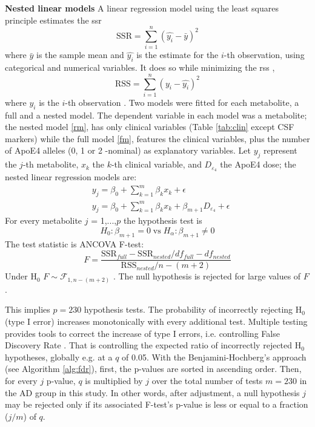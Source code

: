 \documentclass{amsart}
\begin{document}
\leavevmode\newline \textbf{Nested linear models}\hspace{.25cm}
A linear regression model using the least squares principle estimates the \acrfull{ssr}
$$\mathrm{SSR} = \sum_{i=1}^{n} (\hat{y_i}-\bar{y})^2$$ where $\bar{y}$ is the sample mean and $\hat{y_i}$ is the estimate for the $i$-th observation, using categorical and numerical variables. It does so while minimizing the \acrfull{rss} \cite{ott2015introduction}, 
$$\mathrm{RSS} = \sum_{i=1}^{n} (y_i - \hat{y_i})^2$$ where $y_i$ is the $i$-th observation \cite{ott2015introduction}. Two models were fitted for each metabolite, a full and a nested model. The dependent variable in each model was a metabolite; the nested model \eqref{rm}, has only clinical variables (Table \ref{tab:clin} except CSF markers) while the full model \eqref{fm}, features the clinical variables, plus the number of ApoE4 alleles (0, 1 or 2 -nominal) as explanatory variables. Let $y_j$ represent the $j$-th metabolite, $x_k$ the $k$-th clinical variable, and $D_{\varepsilon_4}$ the ApoE4 dose; the nested linear regression models are:
\begin{align}
    & y_j = \beta_0 + \sum_{k=1}^m\beta_kx_k +\epsilon \label{rm} \\
    & y_j = \beta_0 + \sum_{k=1}^m\beta_kx_k + \beta_{m+1}D_{\varepsilon_4} + \epsilon \label{fm}
\end{align}
For every metabolite $j$ = 1,...,$p$ the hypothesis test is 
\[H_0: \beta_{m+1} = 0 \; \mathrm{vs} \; H_\alpha: \beta_{m+1} \neq 0\]
The test statistic is ANCOVA F-test:
\[ F = \frac{\mathrm{SSR}_{full}-\mathrm{SSR}_{nested}/df_{full}-df_{nested}}{\mathrm{RSS}_{nested}/n-(m+2)}\]
Under H$_0$ $F \sim \mathcal{F}_{1, n-(m+2)}$ \cite{ott2015introduction}. The null hypothesis is rejected for large values of $F$.

This implies $p = 230$ hypothesis tests. The probability of incorrectly rejecting H$_0$ (type I error) increases monotonically with every additional test. Multiple testing provides tools to correct the increase of type I errors, i.e. controlling False Discovery Rate \cite{Benjamini1995ControllingTesting}. That is controlling the expected ratio of incorrectly rejected H$_0$ hypotheses, globally e.g. at a $q$ of 0.05. With the Benjamini-Hochberg's approach (see Algorithm \ref{alg:fdr}), first, the p-values are sorted in ascending order. Then, for every $j$ p-value, $q$ is multiplied by $j$ over the total number of tests \cite{Benjamini1995ControllingTesting} $m=230$ in the AD group in this study. In other words, after adjustment, a null hypothesis $j$ may be rejected only if its associated F-test's p-value is less or equal to a fraction ($j/m$) of $q$.
\end{document}
